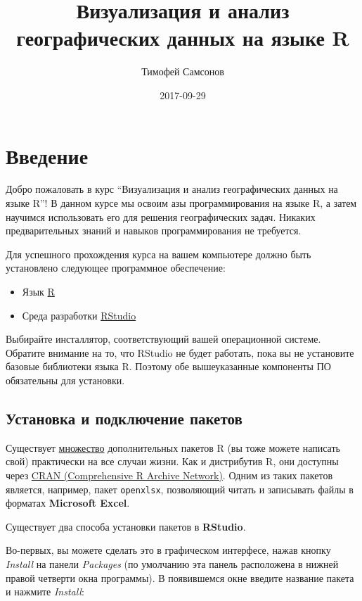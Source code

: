 \documentclass[]{book}
\title{Визуализация и анализ географических данных на языке R}
\author{Тимофей Самсонов}
\date{2017-09-29}
\providecommand{\tightlist}{%
  \setlength{\itemsep}{0pt}\setlength{\parskip}{0pt}}
\begin{document}
\maketitle

{
\setcounter{tocdepth}{1}
\tableofcontents
}
\chapter*{Введение}

Добро пожаловать в курс ``Визуализация и анализ географических данных на
языке R''! В данном курсе мы освоим азы программирования на языке R, а
затем научимся использовать его для решения географических задач.
Никаких предварительных знаний и навыков программирования не требуется.

Для успешного прохождения курса на вашем компьютере должно быть
установлено следующее программное обеспечение:

\begin{itemize}
\tightlist
\item
  Язык \href{https://cran.r-project.org}{R}
\item
  Среда разработки
  \href{https://www.rstudio.com/products/rstudio/download3/}{RStudio}
\end{itemize}

Выбирайте инсталлятор, соответствующий вашей операционной системе.
Обратите внимание на то, что RStudio не будет работать, пока вы не
установите базовые библиотеки языка R. Поэтому обе вышеуказанные
компоненты ПО обязательны для установки.

\section*{Установка и подключение пакетов}\label{---}

Существует \href{https://cran.r-project.org/web/packages/}{множество}
дополнительных пакетов R (вы тоже можете написать свой) практически на
все случаи жизни. Как и дистрибутив R, они доступны через
\href{https://cran.r-project.org}{CRAN (Comprehensive R Archive
Network)}. Одним из таких пакетов является, например, пакет
\texttt{openxlsx}, позволяющий читать и записывать файлы в форматах
\textbf{Microsoft Excel}.

Существует два способа установки пакетов в \textbf{RStudio}.

Во-первых, вы можете сделать это в графическом интерфесе, нажав кнопку
\emph{Install} на панели \emph{Packages} (по умолчанию эта панель
расположена в нижней правой четверти окна программы). В появившемся окне
введите название пакета и нажмите \emph{Install}:
\end{document}
